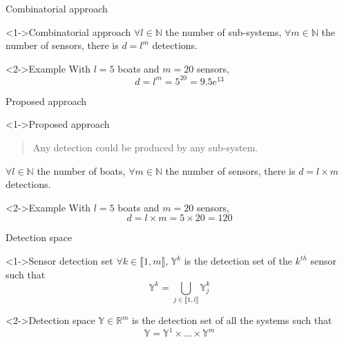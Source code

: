 \documentclass{beamer}
\begin{document}
        \begin{frame}{Combinatorial approach}
            \begin{block}<1->{Combinatorial approach}
                $\forall l \in \mathbb{N}$ the number of sub-systems, $\forall m \in \mathbb{N}$ the number of sensors, there is $d = l^m$ detections.
            \end{block}
            \begin{exampleblock}<2->{Example}
                With $l = 5$ boats and $m = 20$ sensors,
                $$d = l^m = 5^{20} = 9.5e^{13}$$
            \end{exampleblock}
        \end{frame}

        \begin{frame}{Proposed approach}
            \begin{block}<1->{Proposed approach}
                \begin{quote}
                    \centering
                    Any detection could be produced by any sub-system.
                \end{quote}
                $\forall l \in \mathbb{N}$ the number of boats, $\forall m \in \mathbb{N}$ the number of sensors, there is $d = l \times m$ detections.
            \end{block}
            \begin{exampleblock}<2->{Example}
                With $l = 5$ boats and $m = 20$ sensors,
                $$d = l \times m = 5 \times 20 = 120$$
            \end{exampleblock}
        \end{frame}

        \begin{frame}{Detection space}
            \begin{block}<1->{Sensor detection set}
                $\forall k \in \llbracket 1, m\rrbracket$, $\mathbb{Y}^k$ is the detection set of the $k^{th}$ sensor such that
                \begin{equation}
                    \mathbb{Y}^k = \bigcup_{j \in \llbracket 1, l\rrbracket} \mathbb{Y}_j^k
                \end{equation}
            \end{block}
            \begin{block}<2->{Detection space}
                $\mathbb{Y} \in \mathbb{R}^m$ is the detection set of all the systems such that
                \begin{equation}
                    \mathbb{Y} = \mathbb{Y}^1 \times \dots \times \mathbb{Y}^m
                \end{equation}
            \end{block}
        \end{frame}
\end{document}

